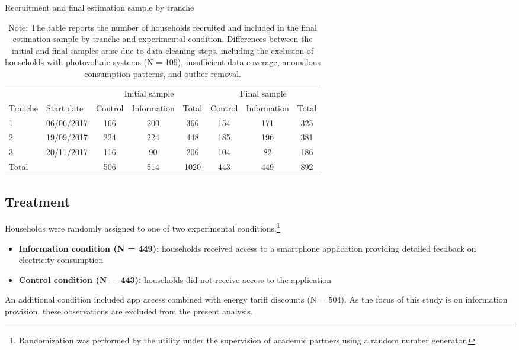 \begin{table}[H]
\centering
\caption{Recruitment and final estimation sample by tranche}
\label{tab:recruitment}
\begin{tabular}{llcccccc}
\toprule
 &  & \multicolumn{3}{c}{Initial sample} & \multicolumn{3}{c}{Final sample} \\
\cmidrule(lr){3-5} \cmidrule(lr){6-8}
Tranche & Start date & Control & Information & Total & Control & Information & Total \\
\midrule
1 & 06/06/2017 & 166 & 200 & 366 & 154 & 171 & 325 \\
2 & 19/09/2017 & 224 & 224 & 448 & 185 & 196 & 381 \\
3 & 20/11/2017 & 116 & 90  & 206 & 104 & 82  & 186 \\
\midrule
Total &  & 506 & 514 & 1020 & 443 & 449 & 892 \\
\bottomrule
\end{tabular}

\caption*{\footnotesize
Note: The table reports the number of households recruited and included in the final estimation sample by tranche and experimental condition. Differences between the initial and final samples arise due to data cleaning steps, including the exclusion of households with photovoltaic systems (N = 109), insufficient data coverage, anomalous consumption patterns, and outlier removal.}
\end{table}


\subsection{Treatment}

Households were randomly assigned to one of two experimental conditions.\footnote{Randomization was performed by the utility under the supervision of academic partners using a random number generator.}

\begin{itemize}
    \item \textbf{Information condition (N = 449):} households received access to a smartphone application providing detailed feedback on electricity consumption
    \item \textbf{Control condition (N = 443):} households did not receive access to the application
\end{itemize}

An additional condition included app access combined with energy tariff discounts (N = 504). As the focus of this study is on information provision, these observations are excluded from the present analysis.

